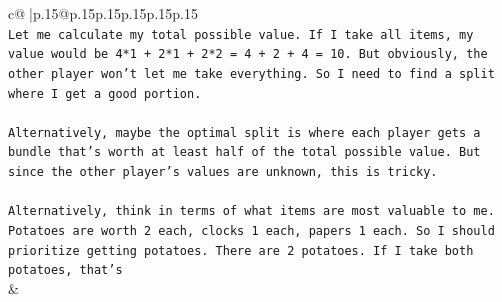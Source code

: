 \documentclass{article}
\begin{document}
{\begin{supertabular}{c@{$\;$}|p{.15\linewidth}@{}p{.15\linewidth}p{.15\linewidth}p{.15\linewidth}p{.15\linewidth}p{.15\linewidth}}
{{{\\ 
\texttt{Let me calculate my total possible value. If I take all items, my value would be 4*1 + 2*1 + 2*2 = 4 + 2 + 4 = 10. But obviously, the other player won't let me take everything. So I need to find a split where I get a good portion.} \\
\\ 
\texttt{Alternatively, maybe the optimal split is where each player gets a bundle that's worth at least half of the total possible value. But since the other player's values are unknown, this is tricky.} \\
\\ 
\texttt{Alternatively, think in terms of what items are most valuable to me. Potatoes are worth 2 each, clocks 1 each, papers 1 each. So I should prioritize getting potatoes. There are 2 potatoes. If I take both potatoes, that's} \\
            }
        }
    }
    & \\ \\


\end{supertabular}}
\end{document}
